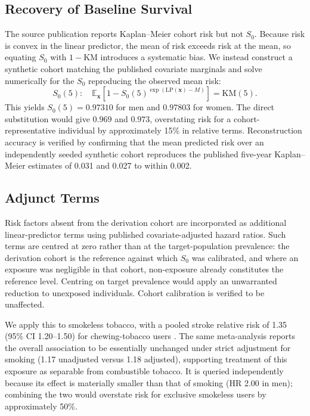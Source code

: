 \documentclass[conference]{IEEEtran}
\begin{document}
\subsection{Recovery of Baseline Survival}
The source publication reports Kaplan--Meier cohort risk but not $S_0$. Because
risk is convex in the linear predictor, the mean of risk exceeds risk at the mean,
so equating $S_0$ with $1 - \mathrm{KM}$ introduces a systematic bias. We instead
construct a synthetic cohort matching the published covariate marginals and solve
numerically for the $S_0$ reproducing the observed mean risk:
\begin{equation}
S_0(5) : \quad \mathbb{E}_{\mathbf{x}}\!\left[1 - S_0(5)^{\exp(\mathrm{LP}(\mathbf{x})-M)}\right] = \mathrm{KM}(5).
\end{equation}
This yields $S_0(5) = 0.97310$ for men and $0.97803$ for women. The direct
substitution would give $0.969$ and $0.973$, overstating risk for a
cohort-representative individual by approximately 15\% in relative terms.
Reconstruction accuracy is verified by confirming that the mean predicted risk over
an independently seeded synthetic cohort reproduces the published five-year
Kaplan--Meier estimates of 0.031 and 0.027 to within 0.002.

\subsection{Adjunct Terms}
Risk factors absent from the derivation cohort are incorporated as additional
linear-predictor terms using published covariate-adjusted hazard ratios. Such
terms are centred at zero rather than at the target-population prevalence: the
derivation cohort is the reference against which $S_0$ was calibrated, and where
an exposure was negligible in that cohort, non-exposure already constitutes the
reference level. Centring on target prevalence would apply an unwarranted
reduction to unexposed individuals. Cohort calibration is verified to be
unaffected.

We apply this to smokeless tobacco, with a pooled stroke relative risk of 1.35
(95\% CI 1.20--1.50) for chewing-tobacco users \cite{gupta2019}. The same
meta-analysis reports the overall association to be essentially unchanged under
strict adjustment for smoking (1.17 unadjusted versus 1.18 adjusted), supporting
treatment of this exposure as separable from combustible tobacco. It is queried
independently because its effect is materially smaller than that of smoking
(HR 2.00 in men); combining the two would overstate risk for exclusive smokeless
users by approximately 50\%.
\end{document}
